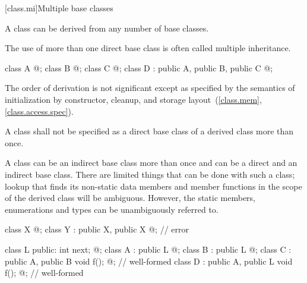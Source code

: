 [class.mi]{Multiple base classes}
%
%

\pnum
A class can be derived from any number of base classes.
\begin{note}
The use of more than one direct base class is often called multiple inheritance.
\end{note}
\begin{example}
\begin{codeblock}
class A { @\commentellip@ };
class B { @\commentellip@ };
class C { @\commentellip@ };
class D : public A, public B, public C { @\commentellip@ };
\end{codeblock}
\end{example}

\pnum
{}%
%
\begin{note}
The order of derivation is not significant except as specified by the
semantics of initialization by constructor,
cleanup, and storage
layout~(\ref{class.mem}, \ref{class.access.spec}).
\end{note}

\pnum
A class shall not be specified as a direct base class of a derived class
more than once.
\begin{note}
A class can be an indirect base class more than once and can be a direct
and an indirect base class. There are limited things that can be done
with such a class;
lookup that finds its non-static data members and member functions
in the scope of the derived class will be ambiguous.
However, the static members, enumerations and types can be
unambiguously referred to.
\end{note}
\begin{example}
\begin{codeblock}
class X { @\commentellip@ };
class Y : public X, public X { @\commentellip@ };             // error

\end{codeblock}
\begin{codeblock}
class L { public: int next;  @\commentellip@ };
class A : public L { @\commentellip@ };
class B : public L { @\commentellip@ };
class C : public A, public B { void f(); @\commentellip@ };   // well-formed
class D : public A, public L { void f(); @\commentellip@ };   // well-formed
\end{codeblock}
\end{example}

